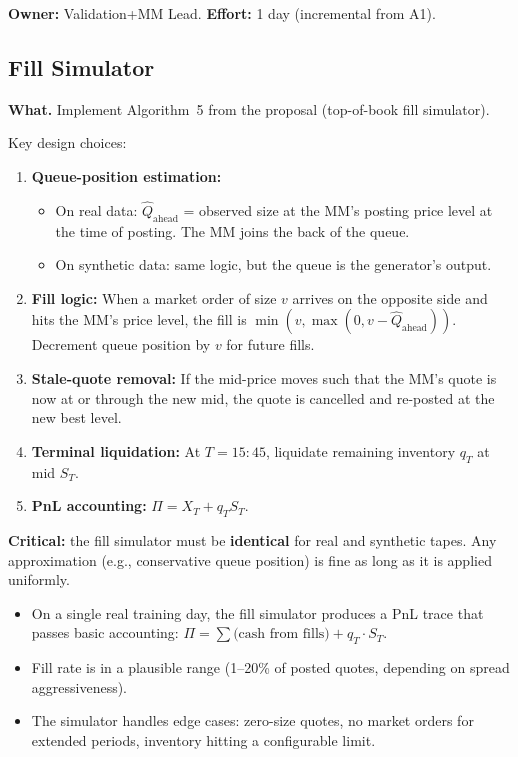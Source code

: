 \documentclass[11pt,a4paper]{article}
\begin{document}
\textbf{Owner:} Validation+MM Lead. \quad \textbf{Effort:} 1 day (incremental from A1).

\subsection{Fill Simulator}

\textbf{What.}
Implement Algorithm~5 from the proposal (top-of-book fill simulator).

Key design choices:
\begin{enumerate}[nosep]
  \item \textbf{Queue-position estimation:}
    \begin{itemize}[nosep]
      \item On real data: $\hat{Q}_{\text{ahead}}$ = observed size at the MM's posting price level at the time of posting.  The MM joins the back of the queue.
      \item On synthetic data: same logic, but the queue is the generator's output.
    \end{itemize}
  \item \textbf{Fill logic:}  When a market order of size $v$ arrives on the opposite side and hits the MM's price level, the fill is $\min(v, \max(0, v - \hat{Q}_{\text{ahead}}))$.  Decrement queue position by $v$ for future fills.
  \item \textbf{Stale-quote removal:}  If the mid-price moves such that the MM's quote is now at or through the new mid, the quote is cancelled and re-posted at the new best level.
  \item \textbf{Terminal liquidation:}  At $T = 15{:}45$, liquidate remaining inventory $q_T$ at mid $S_T$.
  \item \textbf{PnL accounting:}  $\Pi = X_T + q_T S_T$.
\end{enumerate}

\textbf{Critical:} the fill simulator must be \textbf{identical} for real and synthetic tapes.  Any approximation (e.g., conservative queue position) is fine as long as it is applied uniformly.

\begin{successbox}
  \begin{itemize}[nosep]
    \item On a single real training day, the fill simulator produces a PnL trace that passes basic accounting: $\Pi = \sum \text{(cash from fills)} + q_T \cdot S_T$.
    \item Fill rate is in a plausible range (1--20\% of posted quotes, depending on spread aggressiveness).
    \item The simulator handles edge cases: zero-size quotes, no market orders for extended periods, inventory hitting a configurable limit.
  \end{itemize}
\end{successbox}
\end{document}
